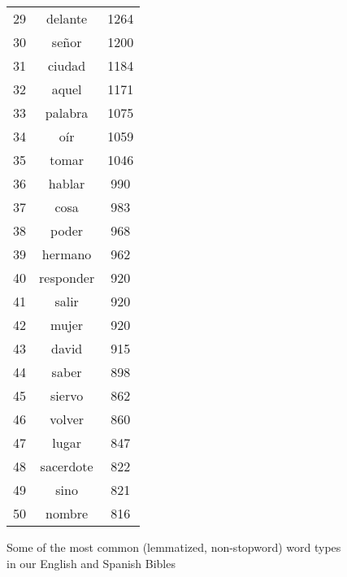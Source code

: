 \begin{figure*}
\begin{tiny}
\begin{centering}
\begin{tabular}{|r|c|c|}
29 & delante & 1264 \\
30 & señor & 1200 \\
31 & ciudad & 1184 \\
32 & aquel & 1171 \\
33 & palabra & 1075 \\
34 & oír & 1059 \\
35 & tomar & 1046 \\
36 & hablar & 990 \\
37 & cosa & 983 \\
38 & poder & 968 \\
39 & hermano & 962 \\
40 & responder & 920 \\
41 & salir & 920 \\
42 & mujer & 920 \\
43 & david & 915 \\
44 & saber & 898 \\
45 & siervo & 862 \\
46 & volver & 860 \\
47 & lugar & 847 \\
48 & sacerdote & 822 \\
49 & sino & 821 \\
50 & nombre & 816 \\
    \hline
  \end{tabular}
  \end{centering}
  \end{tiny}
  \caption{Some of the most common (lemmatized, non-stopword) word types in our
  English and Spanish Bibles}
  \label{fig:mostcommon-en-es}
\end{figure*}

